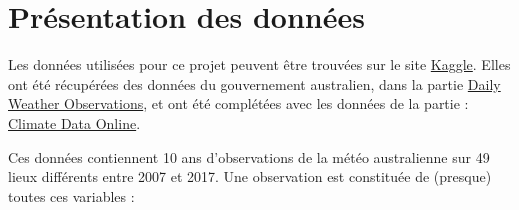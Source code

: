 \documentclass{article}
\begin{document}
\section{Présentation des données}

Les données utilisées pour ce projet peuvent être trouvées sur le site \href{https://www.kaggle.com/jsphyg/weather-dataset-rattle-package}{Kaggle}. Elles ont été récupérées des données du gouvernement australien, dans la partie \href{http://www.bom.gov.au/climate/dwo}{Daily Weather Observations}, et ont été complétées avec les données de la partie :  \href{http://www.bom.gov.au/climate/data}{Climate Data Online}.

Ces données contiennent 10 ans d'observations de la météo australienne sur 49 lieux différents entre 2007 et 2017. Une observation est constituée de (presque) toutes ces variables : 
\end{document}
